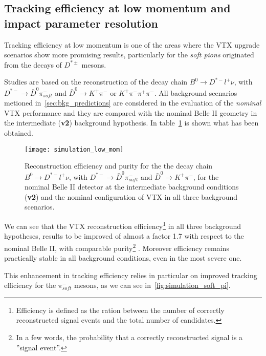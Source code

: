 \subsection{Tracking efficiency at low momentum and impact parameter resolution}

Tracking efficiency at low momentum is one of the areas where the VTX upgrade scenarios show more promising results, particularly for the \textit{soft pions} originated from the decays of $D^{*\pm}$ mesons.

Studies are based on the reconstruction of the decay chain $B^{0} \rightarrow D^{*-}l^{+}\nu$, with $D^{*-} \rightarrow \bar{D}^{0} \pi^{-}_{soft}$ and $\bar{D}^{0} \rightarrow K^{+} \pi^{-}$ or $K^{+} \pi^{-} \pi^{+} \pi^{-}$. All background scenarios metioned in~\autoref{sec:bkg_predictions} are considered in the evaluation of the \textit{nominal} VTX performance and they are compared with the nominal Belle II geometry in the intermediate (\textbf{v2}) background hypothesis. In table~\ref{fig:simulation_low_mom} is shown what has been obtained.

\begin{figure}[h!]
\centering
\texttt{[image: simulation\_low\_mom]}
\caption{Reconstruction efficiency and purity for the the decay chain $B^{0} \rightarrow D^{*-}l^{+}\nu$, with $D^{*-} \rightarrow \bar{D}^{0} \pi^{-}_{soft}$ and $\bar{D}^{0} \rightarrow K^{+} \pi^{-}$, for the nominal Belle II detector at the intermediate background conditions (\textbf{v2}) and the nominal configuration of VTX in all three background scenarios.}
\label{fig:simulation_low_mom}
\end{figure}

We can see that the VTX reconstruction efficiency\footnote{Efficiency is defined as the ration between the number of correctly reconstructed signal events and the total number of candidates.}  in all three background hypotheses, results to be improved of almost a factor 1.7 with respect to the nominal Belle II, with comparable purity\footnote{In a few words, the probability that a correctly reconstructed signal  is a ''signal event''.} . Moreover efficiency remains practically stable in all background conditions, even in the most severe one.

This enhancement in tracking efficiency relies in particular on improved tracking efficiency for the $\pi_{soft}^{-}$ mesons, as we can see in~\autoref{fig:simulation_soft_pi}.


